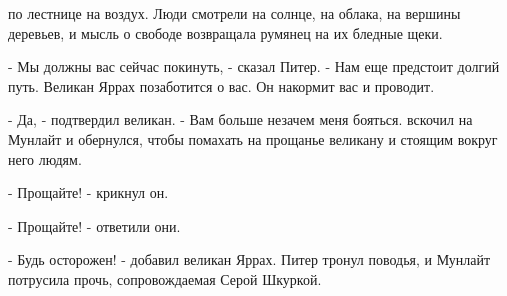 по лестнице на воздух. Люди смотрели на солнце, на облака, на вершины 
деревьев, и мысль о свободе возвращала румянец на их бледные щеки.
\par- Мы должны вас сейчас покинуть, - сказал Питер. - Нам еще 
предстоит долгий путь. Великан Яррах позаботится о вас. Он накормит 
вас и проводит.
\par- Да, - подтвердил великан. - Вам больше незачем меня бояться.
 вскочил на Мунлайт и обернулся, чтобы помахать на прощанье 
великану и стоящим вокруг него людям.
\par- Прощайте! - крикнул он.
\par- Прощайте! - ответили они.
\par- Будь осторожен! - добавил великан Яррах. Питер тронул поводья, и 
Мунлайт потрусила прочь, сопровождаемая Серой Шкуркой.
